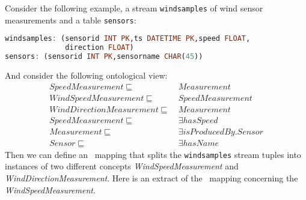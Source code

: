 




Consider the following example, a stream \texttt{windsamples} of wind sensor measurements  and a table \texttt{sensors}:
\begin{lstlisting}[style=HaskellSNEE,language=Haskell,frame=none]
windsamples: (sensorid INT PK,ts DATETIME PK,speed FLOAT,
              direction FLOAT)
sensors: (sensorid INT PK,sensorname CHAR(45))
\end{lstlisting}
And consider the following ontological view:
\begin{align*}%
SpeedMeasurement \sqsubseteq\ & Measurement \\
WindSpeedMeasurement \sqsubseteq\ & SpeedMeasurement \\
WindDirectionMeasurement \sqsubseteq\ & Measurement \\
SpeedMeasurement \sqsubseteq\ & \exists hasSpeed \\
Measurement \sqsubseteq\ & \exists isProducedBy.Sensor \\
Sensor \sqsubseteq\ & \exists hasName
\end{align*}
%
Then we can define an \stwoo\ mapping that splits the \linebreak \texttt{windsamples} stream tuples into instances of two different concepts \textit{WindSpeedMeasurement} and \textit{WindDirectionMeasurement}. Here is an extract of the \stwoo\ mapping concerning the \textit{WindSpeedMeasurement}.

